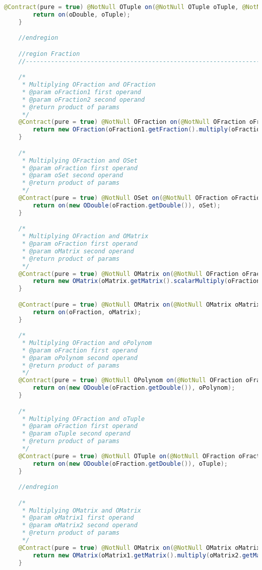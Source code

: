 \begin{lstlisting}[caption=Times (Schwenke),label=list:Times,language=Java]
    @Contract(pure = true) @NotNull OTuple on(@NotNull OTuple oTuple, @NotNull ODouble oDouble) {
        return on(oDouble, oTuple);
    }

    //endregion

    //region Fraction
    //------------------------------------------------------------------------------------

    /*
     * Multiplying OFraction and OFraction
     * @param oFraction1 first operand
     * @param oFraction2 second operand
     * @return product of params
     */
    @Contract(pure = true) @NotNull OFraction on(@NotNull OFraction oFraction1, @NotNull OFraction oFraction2) {
        return new OFraction(oFraction1.getFraction().multiply(oFraction2.getFraction()));
    }

    /*
     * Multiplying OFraction and OSet
     * @param oFraction first operand
     * @param oSet second operand
     * @return product of params
     */
    @Contract(pure = true) @NotNull OSet on(@NotNull OFraction oFraction, @NotNull OSet oSet) {
        return on(new ODouble(oFraction.getDouble()), oSet);
    }

    /*
     * Multiplying OFraction and OMatrix
     * @param oFraction first operand
     * @param oMatrix second operand
     * @return product of params
     */
    @Contract(pure = true) @NotNull OMatrix on(@NotNull OFraction oFraction, @NotNull OMatrix oMatrix) {
        return new OMatrix(oMatrix.getMatrix().scalarMultiply(oFraction.getDouble()));
    }

    @Contract(pure = true) @NotNull OMatrix on(@NotNull OMatrix oMatrix, @NotNull OFraction oFraction) {
        return on(oFraction, oMatrix);
    }

    /*
     * Multiplying OFraction and oPolynom
     * @param oFraction first operand
     * @param oPolynom second operand
     * @return product of params
     */
    @Contract(pure = true) @NotNull OPolynom on(@NotNull OFraction oFraction, @NotNull OPolynom oPolynom) {
        return on(new ODouble(oFraction.getDouble()), oPolynom);
    }

    /*
     * Multiplying OFraction and oTuple
     * @param oFraction first operand
     * @param oTuple second operand
     * @return product of params
     */
    @Contract(pure = true) @NotNull OTuple on(@NotNull OFraction oFraction, @NotNull OTuple oTuple) {
        return on(new ODouble(oFraction.getDouble()), oTuple);
    }

    //endregion

    /*
     * Multiplying OMatrix and OMatrix
     * @param oMatrix1 first operand
     * @param oMatrix2 second operand
     * @return product of params
     */
    @Contract(pure = true) @NotNull OMatrix on(@NotNull OMatrix oMatrix1, @NotNull OMatrix oMatrix2) {
        return new OMatrix(oMatrix1.getMatrix().multiply(oMatrix2.getMatrix()));
    }


\end{lstlisting}
